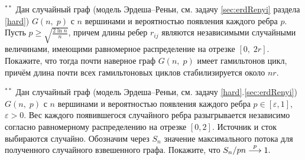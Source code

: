 \begin{problem}$^{**}$
Дан случайный граф (модель Эрдеша--Реньи, см. задачу \ref{sec:erdRenyi} раздела \ref{hard}) $G\left( {n,\;p} \right)$ с $n$ вершинами и 
вероятностью появления каждого ребра $p$. Пусть $p\ge \sqrt {\frac{2 \ln 
n}{n}} $, причем длины ребер $r_{ij} $ являются независимыми случайными величинами, имеющими равномерное распределение на отрезке 
$\left[ {0,\;2r} \right]$. Покажите, что тогда почти наверное граф $G\left( 
{n,\;p} \right)$ имеет гамильтонов цикл, причём длина почти всех 
гамильтоновых циклов стабилизируется около $nr$.
\end{problem}

\begin{problem}$^{**}$
Дан случайный граф (модель Эрдеша--Реньи, см. задачу \ref{hard}.\ref{sec:erdRenyi}) $G\left( {n,\;p} \right)$ с $n$ вершинами и 
вероятностью появления каждого ребра $p\in \left[ {\varepsilon ,1} \right]$, 
$\varepsilon >0$. Вес каждого появившегося случайного ребра разыгрывается  независимо 
согласно равномерному распределению на отрезке $\left[ {0,2} 
\right]$.  Источник и сток выбираются случайно. Обозначим через $S_n $ значение максимального потока для 
полученного случайного взвешенного графа. Покажите, что 
${S_n } 
\mathord{\left/ {\vphantom {{S_n } {pn}}} \right. \kern-\nulldelimiterspace} 
{pn}\buildrel p \over \longrightarrow 1.$
\end{problem}

